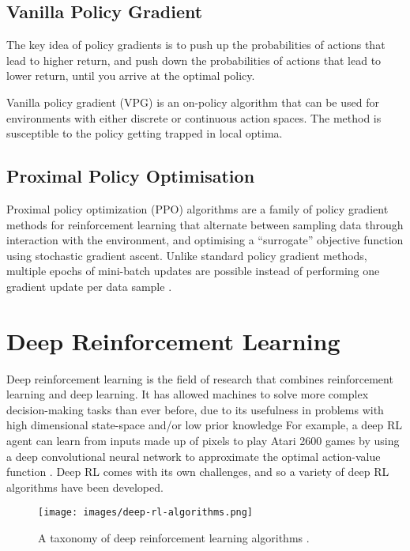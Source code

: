 \documentclass{article}
\begin{document}
\subsection{Vanilla Policy Gradient}

The key idea of policy gradients is to push up the probabilities of actions that lead to higher return, and push down the probabilities of actions that lead to lower return, until you arrive at the optimal policy.

Vanilla policy gradient (VPG) is an on-policy algorithm that can be used for environments with either discrete or continuous action spaces. The method is susceptible to the policy getting trapped in local optima.

\subsection{Proximal Policy Optimisation}

Proximal policy optimization (PPO) algorithms are a family of policy gradient methods for reinforcement learning that alternate between sampling data through interaction with the environment, and optimising a ``surrogate'' objective function using stochastic gradient ascent. Unlike standard policy gradient methods, multiple epochs of mini-batch updates are possible instead of performing one gradient update per data sample \cite{DBLP:journals/corr/SchulmanWDRK17}.

\section{Deep Reinforcement Learning}

Deep reinforcement learning is the field of research that combines reinforcement learning and deep learning. It has allowed machines to solve more complex decision-making tasks than ever before, due to its usefulness in problems with high dimensional state-space and/or low prior knowledge \cite{DBLP:journals/corr/abs-1811-12560} For example, a deep RL agent can learn from inputs made up of pixels to play Atari 2600 games by using a deep convolutional neural network to approximate the optimal action-value function \cite{Mnih2015}. Deep RL comes with its own challenges, and so a variety of deep RL algorithms have been developed.

\begin{figure}[h]
  \centering
  \texttt{[image: images/deep-rl-algorithms.png]}
  \caption{A taxonomy of deep reinforcement learning algorithms \cite{openai_2018}.}
  \label{fig:deep-rl-algorithms}
\end{figure}
\end{document}
